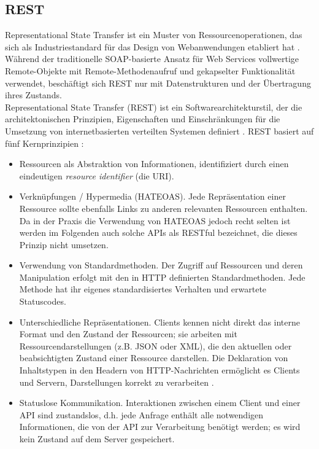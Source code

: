 \subsection{REST}

Representational State Transfer ist ein Muster von Ressourcenoperationen, das sich als Industriestandard für das Design von Webanwendungen etabliert hat \parencite[2]{battle2008bridging}. Während der traditionelle SOAP-basierte Ansatz für Web Services vollwertige Remote-Objekte mit Remote-Methodenaufruf und gekapselter Funktionalität verwendet, beschäftigt sich REST nur mit Datenstrukturen und der Übertragung ihres Zustands. \\

Representational State Transfer (REST) ist ein Softwarearchitekturstil, der die architektonischen Prinzipien, Eigenschaften und Einschränkungen für die Umsetzung von internetbasierten verteilten Systemen definiert \parencite[86]{fielding2000architectural}. REST basiert auf fünf Kernprinzipien \parencite[11]{tilkov2015rest}:

\begin{itemize}
	\item Ressourcen als Abstraktion von Informationen, identifiziert durch einen eindeutigen \emph{resource identifier} (die URI).
	\item Verknüpfungen / Hypermedia (HATEOAS). Jede Repräsentation einer Ressource sollte ebenfalls Links zu anderen relevanten Ressourcen enthalten. Da in der Praxis die Verwendung von HATEOAS jedoch recht selten ist \parencite[35--36]{rodriguez2016rest} werden im Folgenden auch solche APIs als RESTful bezeichnet, die dieses Prinzip nicht umsetzen.
	\item Verwendung von Standardmethoden. Der Zugriff auf Ressourcen und deren Manipulation erfolgt mit den in HTTP definierten Standardmethoden. Jede Methode hat ihr eigenes standardisiertes Verhalten und erwartete Statuscodes.
	\item Unterschiedliche Repräsentationen. Clients kennen nicht direkt das interne Format und den Zustand der Ressourcen; sie arbeiten mit Ressourcendarstellungen (z.B. JSON oder XML), die den aktuellen oder beabsichtigten Zustand einer Ressource darstellen. Die Deklaration von Inhaltstypen in den Headern von HTTP-Nachrichten ermöglicht es Clients und Servern, Darstellungen korrekt zu verarbeiten \parencite[23]{rodriguez2016rest}.
	\item Statuslose Kommunikation. Interaktionen zwischen einem Client und einer API sind zustandslos, d.h. jede Anfrage enthält alle notwendigen Informationen, die von der API zur Verarbeitung benötigt werden; es wird kein Zustand auf dem Server gespeichert.
\end{itemize}

